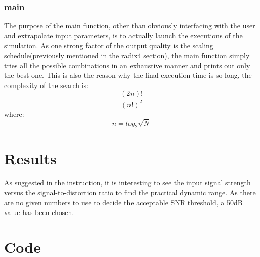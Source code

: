 \documentclass[a4paper]{article}
\begin{document}
\subsubsection{main}
The purpose of the main function, other than obviously interfacing with the user and extrapolate input parameters, is to actually launch the executions of the simulation.
As one strong factor of the output quality is the scaling schedule(previously mentioned in the radix4 section), the main function simply tries all the possible combinations in an exhaustive manner and prints out only the best one. This is also the reason why the final execution time is so long, the complexity of the search is: $$\frac{(2n)!}{(n!)^2}$$
where:
$$n = log_2{\sqrt{N}}$$
\section{Results}
As suggested in the instruction, it is interesting to see the input signal strength versus the signal-to-distortion ratio to find the practical dynamic range.
As there are no given numbers to use to decide the acceptable SNR threshold, a 50dB value has been chosen.
\begin{figure}
	\centering
	\resizebox{1.0\textwidth}{!}{}
\end{figure}
\begin{figure}
	\centering
	\resizebox{1.0\textwidth}{!}{}
\end{figure}
\begin{figure}
	\centering
	\resizebox{1.0\textwidth}{!}{}
\end{figure}
\begin{figure}
	\centering
	\resizebox{1.0\textwidth}{!}{}
\end{figure}

\section{Code}
\end{document}
